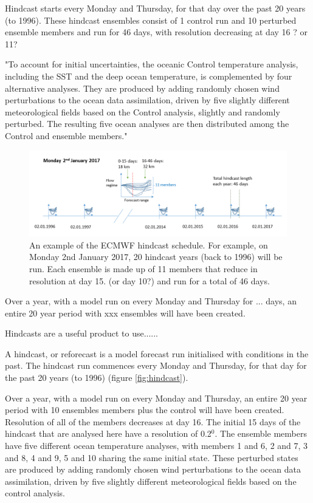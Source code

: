 Hindcast starts every Monday and Thursday, for that day over the past 20 years (to 1996). These hindcast ensembles consist of 1 control run and 10 perturbed ensemble members and run for 46 days, with resolution decreasing at day 16 ? or 11?

"To account for initial uncertainties, the oceanic Control temperature analysis, including the SST and the deep ocean temperature, is complemented by four alternative analyses. They are produced by adding randomly chosen wind perturbations to the ocean data assimilation, driven by five slightly different meteorological fields based on the Control analysis, slightly and randomly perturbed. The resulting five ocean analyses are then distributed among the Control and ensemble members."

\begin{figure}
	
	\includegraphics[width=34pc,angle=0]{ec_hindcast2.png}
	\caption{An example of the ECMWF hindcast schedule. For example, on Monday 2nd January 2017, 20 hindcast years (back to 1996) will be run. Each ensemble is made up of 11 members that reduce in resolution at day 15. (or day 10?) and run for a total of 46 days.}\label{fig:ecmwf_hindcast}
	\centering
\end{figure}

Over a year, with a model run on every Monday and Thursday for ... days, an entire 20 year period with xxx ensembles will have been created.

Hindcasts are a useful product to use......

A hindcast, or reforecast is a model forecast run initialised with conditions in the past. The hindcast run commences every Monday and Thursday, for that day for the past 20 years (to 1996) (figure \ref{fig:hindcast}).


Over a year, with a model run on every Monday and Thursday, an entire 20 year period with 10 ensembles members plus the control will have been created. Resolution of all of the members decreases at day 16. The initial 15 days of the hindcast that are analysed here have a resolution of 0.2$^0$. The ensemble members have five different ocean temperature analyses, with members 1 and 6, 2 and 7, 3 and 8, 4 and 9, 5 and 10 sharing the same initial state. These perturbed states are produced by adding randomly chosen wind perturbations to the ocean data assimilation, driven by five slightly different meteorological fields based on the control analysis.


